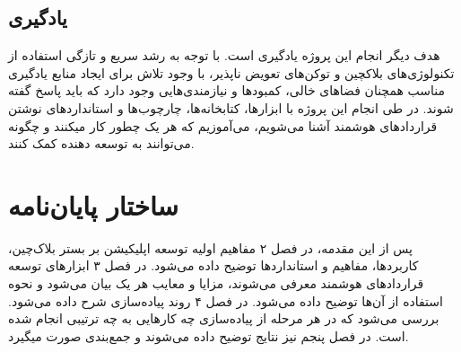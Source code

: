 \subsection{یادگیری}
هدف دیگر انجام این پروژه یادگیری است. با توجه به رشد سریع و تازگی استفاده از تکنولوژی‌های بلاکچین و توکن‌های تعویض ناپذیر، با وجود تلاش برای ایجاد منابع یادگیری مناسب همچنان فضاهای خالی، کمبودها و نیازمندی‌هایی وجود دارد که باید پاسخ گفته شوند. در طی انجام این پروژه با ابزارها، کتابخانه‌ها، چارچوب‌ها و استانداردهای نوشتن قراردادهای هوشمند آشنا می‌شویم، می‌آموزیم که هر یک چطور کار میکنند و چگونه می‌توانند به توسعه دهنده کمک کنند.

\section{ساختار پایان‌نامه}
پس از این مقدمه، در فصل ۲ مفاهیم اولیه توسعه اپلیکیشن بر بستر بلاک‌چین، کاربردها، مفاهیم و استاندارد‌ها توضیح داده می‌شود. در فصل ۳ ابزار‌های توسعه قرارداد‌های هوشمند معرفی می‌شوند، مزایا و معایب هر یک بیان می‌شود و نحوه استفاده از آن‌ها توضیح داده می‌شود. در فصل ۴ روند پیاده‌سازی شرح داده می‌شود. بررسی می‌شود که در هر مرحله از پیاده‌سازی چه کارهایی به چه ترتیبی انجام شده است. در فصل پنجم نیز نتایج توضیح داده می‌شوند و جمع‌بندی صورت میگیرد.
